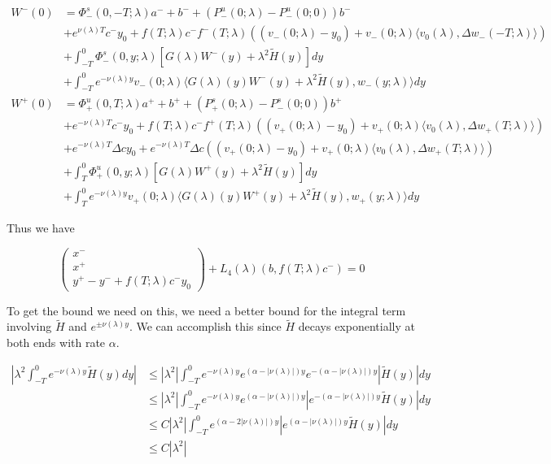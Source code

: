 \documentclass[12pt]{article}
\begin{document}
\begin{enumerate}
\begin{align*}
W^-(0) &= \Phi^s_-(0, -T; \lambda )a^- + b^- + (P^u_-(0; \lambda) - P^u_-(0; 0))b^- \\
&+ e^{\nu(\lambda)T} c^- y_0 + f(T; \lambda) c^- f^-(T; \lambda) ( (v_-(0; \lambda) - y_0) + v_-(0; \lambda) \langle  v_0(\lambda), \Delta w_-(-T; \lambda) \rangle) \\
&+ \int_{-T}^0 \Phi^s_-(0, y; \lambda) [ G(\lambda)W^-(y) + \lambda^2 \tilde{H}(y) ] dy \\
&+ \int_{-T}^0 
e^{-\nu(\lambda)y} v_-(0; \lambda) \langle G(\lambda)(y)W^-(y) + \lambda^2 \tilde{H}(y), w_-(y; \lambda) \rangle dy \\
W^+(0) &= \Phi^u_+(0, T; \lambda)a^+ + b^+ + (P^s_+(0; \lambda) - P^s_-(0; 0))b^+ \\
&+ e^{-\nu(\lambda)T} c^- y_0 + f(T; \lambda) c^- f^+(T; \lambda) ( (v_+(0; \lambda) - y_0) + v_+(0; \lambda) \langle  v_0(\lambda), \Delta w_+(T; \lambda) \rangle) \\
&+ e^{-\nu(\lambda)T} \Delta c y_0 + e^{-\nu(\lambda)T} \Delta c ( (v_+(0; \lambda) - y_0) + v_+(0; \lambda) \langle  v_0(\lambda), \Delta w_+(T; \lambda) \rangle) \\
&+ \int_T^0 \Phi^u_+(0, y; \lambda) [ G(\lambda)W^+(y) + \lambda^2 \tilde{H}(y) ] dy \\
&+ \int_T^0 e^{-\nu(\lambda)y} v_+(0; \lambda) \langle G(\lambda)(y)W^+(y) + \lambda^2 \tilde{H}(y), w_+(y; \lambda) \rangle dy
\end{align*}

Thus we have

\[
\begin{pmatrix}x^- \\ x^+ \\ y^+ - y^- + f(T; \lambda) c^- y_0 \end{pmatrix} + L_4(\lambda)(b, f(T; \lambda) c^-) = 0
\]

To get the bound we need on this, we need a better bound for the integral term involving $\tilde{H}$ and $e^{\pm \nu(\lambda)y}$. We can accomplish this since $\tilde{H}$ decays exponentially at both ends with rate $\alpha$.

\begin{align*}
\left| \lambda^2 \int_{-T}^0 e^{-\nu(\lambda)y} \tilde{H}(y) dy \right|
&\leq |\lambda^2| \int_{-T}^0 e^{-\nu(\lambda)y} e^{(\alpha - |\nu(\lambda)|)y} e^{-(\alpha - |\nu(\lambda)|)y}|\tilde{H}(y)| dy \\
&\leq |\lambda^2| \int_{-T}^0 e^{-\nu(\lambda)y} e^{(\alpha - |\nu(\lambda)|)y} | e^{-(\alpha - |\nu(\lambda)|)y}\tilde{H}(y)| dy \\
&\leq C |\lambda^2| \int_{-T}^0 e^{(\alpha - 2 |\nu(\lambda)|)y} | e^{(\alpha - |\nu(\lambda)|)y}\tilde{H}(y)| dy \\
&\leq C |\lambda^2|
\end{align*}


\end{enumerate}
\end{document}
